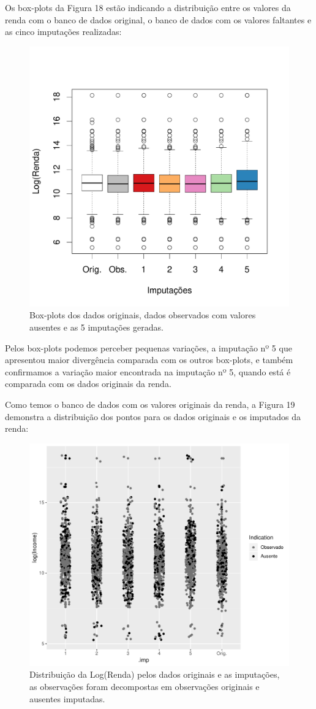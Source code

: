 \documentclass[]{article}
\begin{document}
Os box-plots da Figura 18 estão indicando a distribuição entre os
valores da renda com o banco de dados original, o banco de dados com os
valores faltantes e as cinco imputações realizadas:

\begin{figure}[H]

{\centering \includegraphics[width=0.6\linewidth]{p55-graf} 

}

\caption{Box-plots dos dados originais, dados observados com valores ausentes e as 5 imputações geradas.}\label{fig:unnamed-chunk-26}
\end{figure}

Pelos box-plots podemos perceber pequenas variações, a imputação nº 5
que apresentou maior divergência comparada com os outros box-plots, e
também confirmamos a variação maior encontrada na imputação nº 5, quando
está é comparada com os dados originais da renda.

Como temos o banco de dados com os valores originais da renda, a Figura
19 demonstra a distribuição dos pontos para os dados originais e os
imputados da renda:

\begin{figure}[H]

{\centering \includegraphics[width=0.6\linewidth]{Relatorio_IC_files/figure-latex/unnamed-chunk-27-1} 

}

\caption{Distribuição da Log(Renda) pelos dados originais e as imputações, as observações foram decompostas em observações originais e ausentes imputadas.}\label{fig:unnamed-chunk-27}
\end{figure}
\end{document}
